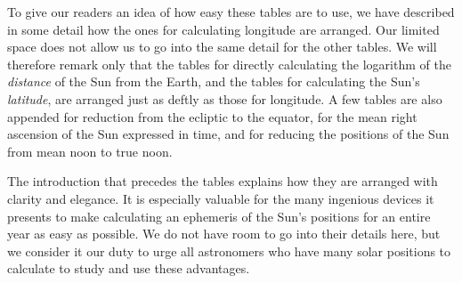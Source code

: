 To give our readers an idea of how easy these tables are to use, we have described in some detail how the ones for calculating longitude are arranged. Our limited space does not allow us to go into the same detail for the other tables. We will therefore remark only that the tables for directly calculating the logarithm of the \emph{distance} of the Sun from the Earth, and the tables for calculating the Sun's \emph{latitude}, are arranged just as deftly as those for longitude. A few tables are also appended for reduction from the ecliptic to the equator, for the mean right ascension of the Sun expressed in time, and for reducing the positions of the Sun from mean noon to true noon.

The introduction that precedes the tables explains how they are arranged with clarity and elegance. It is especially valuable for the many ingenious devices it presents to make calculating an ephemeris of the Sun's positions for an entire year as easy as possible. We do not have room to go into their details here, but we consider it our duty to urge all astronomers who have many solar positions to calculate to study and use these advantages.
